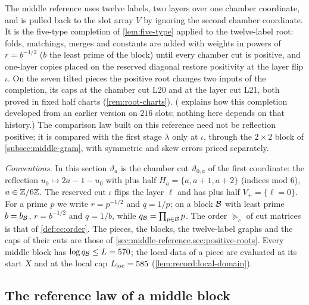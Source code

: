 The middle reference uses twelve labels, two layers over one chamber
coordinate, and is pulled back to the slot array $V$ by ignoring the second
chamber coordinate. It is the five-type completion of \cref{lem:five-type}
applied to the twelve-label root: folds, matchings, merges and constants are
added with weights in powers of $r=b^{-1/2}$ ($b$ the least prime of the block) until every chamber cut is
positive, and one-layer copies placed on the reserved diagonal restore
positivity at the layer flip $\iota$. On the seven tilted pieces the positive
root changes two inputs of the completion, its caps at the chamber cut L20 and
at the layer cut L21, both proved in fixed half charts
(\cref{rem:root-charts}). ( explains how this
completion developed from an earlier version on $216$ slots;
nothing here depends on that history.) The comparison law built
on this reference need not be reflection positive; it is compared with
the first stage $\lambda$ only at $\iota$, through the
$2\times2$ block of \cref{subsec:middle-gram}, with symmetric and
skew errors priced separately.

\emph{Conventions.} In this section $\vartheta_a$ is the chamber cut
$\vartheta_{0,a}$ of the first coordinate: the reflection
$u_0\mapsto2a-1-u_0$ with plus half $H_a=\{a,a+1,a+2\}$ (indices mod $6$),
$a\in\mathbb Z/6\mathbb Z$. The reserved cut $\iota$ flips the layer $\ell$ and has plus
half $V_+=\{\ell=0\}$. For a prime $p$ we write $r=p^{-1/2}$ and $q=1/p$; on a
block $\mathcal B$ with least prime $b=b_{\mathcal B}$, $r=b^{-1/2}$ and $q=1/b$, while
$q_{\mathcal B}=\prod_{p\in\mathcal B}p$. The order $\succeq_c$ of cut matrices is that of
\cref{def:cc:order}. The pieces, the blocks, the twelve-label graphs and the
caps of their cuts are those of \cref{sec:middle-reference,sec:positive-roots}.
Every middle block has $\log q_{\mathcal B}\le L=570$; the local data of a piece are
evaluated at its start $X$ and at the local cap $L_{\rm loc}=585$
(\cref{lem:record:local-domain}).

\subsection{The reference law of a middle block}
\label{subsec:middle-reference-law}

